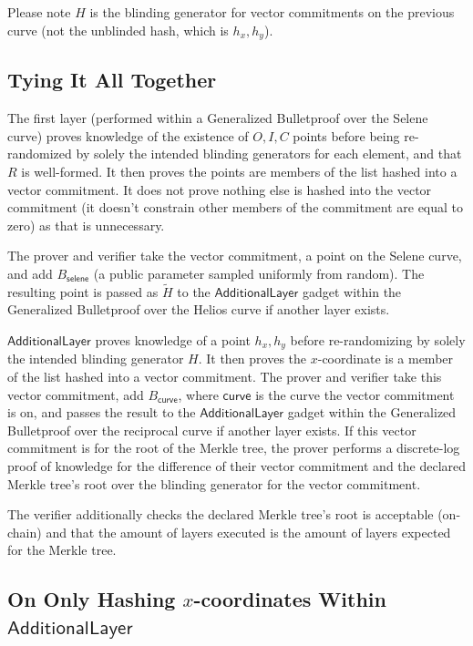 \documentclass[]{article}
\begin{document}
Please note $H$ is the blinding generator for vector commitments on the previous curve (not the unblinded hash, which is $h_x, h_y$).

\subsection{Tying It All Together}

The first layer (performed within a Generalized Bulletproof over the Selene curve) proves knowledge of the existence of $O, I, C$ points before being re-randomized by solely the intended blinding generators for each element, and that $R$ is well-formed. It then proves the points are members of the list hashed into a vector commitment. It does not prove nothing else is hashed into the vector commitment (it doesn't constrain other members of the commitment are equal to zero) as that is unnecessary.

The prover and verifier take the vector commitment, a point on the Selene curve, and add $B_{\mathsf{selene}}$ (a public parameter sampled uniformly from random). The resulting point is passed as $\tilde{H}$ to the $\mathsf{AdditionalLayer}$ gadget within the Generalized Bulletproof over the Helios curve if another layer exists.

$\mathsf{AdditionalLayer}$ proves knowledge of a point $h_x, h_y$ before re-randomizing by solely the intended blinding generator $H$. It then proves the $x$-coordinate is a member of the list hashed into a vector commitment. The prover and verifier take this vector commitment, add $B_{\mathsf{curve}}$, where $\mathsf{curve}$ is the curve the vector commitment is on, and passes the result to the $\mathsf{AdditionalLayer}$ gadget within the Generalized Bulletproof over the reciprocal curve if another layer exists. If this vector commitment is for the root of the Merkle tree, the prover performs a discrete-log proof of knowledge for the difference of their vector commitment and the declared Merkle tree's root over the blinding generator for the vector commitment.

The verifier additionally checks the declared Merkle tree's root is acceptable (on-chain) and that the amount of layers executed is the amount of layers expected for the Merkle tree.

\subsection{On Only Hashing $x$-coordinates Within $\mathsf{AdditionalLayer}$}
\end{document}

